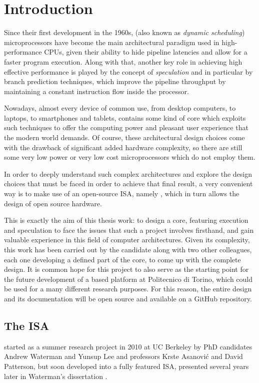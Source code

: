 \chapter{Introduction}
Since their first development in the 1960s, \emph{\ooo} (also known as \emph{dynamic scheduling}) microprocessors have become the main architectural paradigm used in high-performance CPUs, given their ability to hide pipeline latencies and allow for a faster program execution. Along with that, another key role in achieving high effective performance is played by the concept of \emph{speculation} and in particular by branch prediction techniques, which improve the pipeline throughput by maintaining a constant instruction flow inside the processor.

Nowadays, almost every device of common use, from desktop computers, to laptops, to smartphones and tablets, contains some kind of \ooo core which exploits such techniques to offer the computing power and pleasant user experience that the modern world demands. Of course, these architectural design choices come with the drawback of significant added hardware complexity, so there are still some very low power or very low cost microprocessors which do not employ them.

In order to deeply understand such complex architectures and explore the design choices that must be faced in order to achieve that final result, a very convenient way is to make use of an open-source \acf{ISA}, namely \riscv, which in turn allows the design of open source hardware. 

This is exactly the aim of this thesis work: to design a \riscv core, featuring \ooo execution and speculation to face the issues that such a project involves firsthand, and gain valuable experience in this field of computer architectures. Given its complexity, this work has been carried out by the candidate along with two other colleagues, each one developing a defined part of the core, to come up with the complete design. It is common hope for this project to also serve as the starting point for the future development of a \riscv based platform at Politecnico di Torino, which could be used for a many different research purposes. For this reason, the entire design and its documentation will be open source and available on a GitHub repository.

\section{The \riscv ISA}
\riscv started as a summer research project in 2010 at UC Berkeley by PhD candidates Andrew Waterman and Yunsup Lee and professors Krste Asanović and David Patterson, but soon developed into a fully featured \ac{ISA}, presented several years later in Waterman's dissertation \cite{waterman}. 

